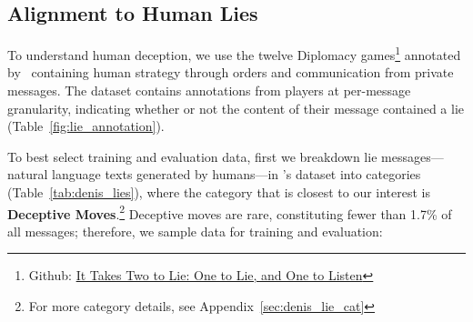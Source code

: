 \subsection{Alignment to Human Lies}
\label{sec:denis_data}
To understand human deception, we use the twelve Diplomacy games\footnote{Github: \href{https://github.com/DenisPeskoff/2020_acl_diplomacy}{It Takes Two to Lie: One to Lie, and One to Listen}} annotated by~\citet{peskov2020takes} containing human strategy through orders and communication from private messages. The dataset contains annotations from players at per-message granularity, indicating whether or not the content of their message contained a lie (Table~\ref{fig:lie_annotation}).  


To best select training and evaluation data, first we breakdown lie messages---natural language texts generated by humans---in \citeauthor{peskov2020takes}'s dataset into categories (Table~\ref{tab:denis_lies}), where the category that is closest to our interest is \textbf{Deceptive Moves}.\footnote{For more category details, see Appendix~\ref{sec:denis_lie_cat}} Deceptive moves are rare, constituting fewer than 1.7\% of all messages; therefore, we sample data for training and evaluation:
